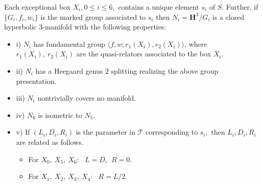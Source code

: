 \begin{conjecture}\label{GMT 1.31}
Each  exceptional 
box $X_i, 0\le i\le 6,$ contains a unique element $s_i$ of $S.$
Further{\textrm ,} if $\{G_i, f_i, w_i\}$ is the marked group
associated to $s_i$ then
$N_i = {\mathbf H}^3/G_i$ is a closed hyperbolic $3$\/{\textrm -}\/manifold
with the following properties\/{\textrm :}
\begin{itemize}
\item{i)} $N_i$ has fundamental group
$\langle f,w;r_1(X_i),r_2(X_i)\rangle${\textrm ,}
where $r_1(X_i),\ r_2(X_i)$ are the quasi\/{\textrm -}\/relators
associated to the box $X_i.$
\item{ii)}  $N_i$ has a Heegaard genus $2$ splitting realizing the above group presentation.

\item{iii)} $N_i$ nontrivially covers no manifold.  

\item{iv)} $N_6$ is isometric to $N_5.$
 
\item{v)} If $(L_i, D_i, R_i)$ is the parameter in ${\mathcal T}$
corresponding to $s_i,$ then $L_i, D_i, R_i$ are related as follows.
\begin{itemize}
\item[] For $X_0,\ X_5,\ X_6:\ \ \ L=D, \ \ R=0.$  

\item[] For $X_1,\ X_2,\ X_3,\ X_4:\ \ \ R=L/2.$
\end{itemize}
\end{itemize}
\end{conjecture}

